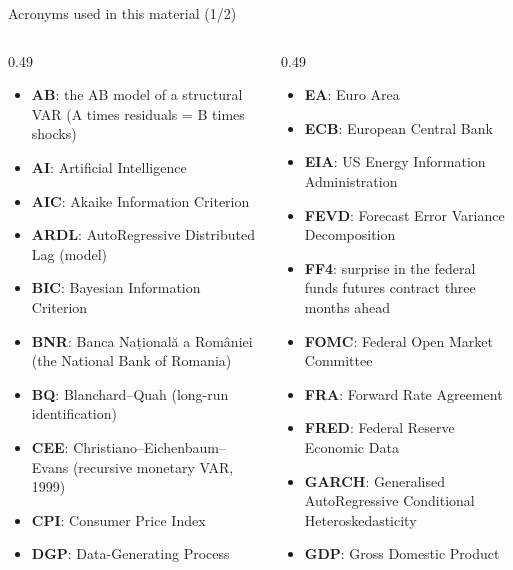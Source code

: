 \begin{frame}{Acronyms used in this material (1/2)}
\begin{columns}[T]
\begin{column}{0.49\textwidth}
\begin{itemize}\setlength{\itemsep}{0pt}
    \item \textbf{AB}: the AB model of a structural VAR (A times residuals = B times shocks)
    \item \textbf{AI}: Artificial Intelligence
    \item \textbf{AIC}: Akaike Information Criterion
    \item \textbf{ARDL}: AutoRegressive Distributed Lag (model)
    \item \textbf{BIC}: Bayesian Information Criterion
    \item \textbf{BNR}: Banca Națională a României (the National Bank of Romania)
    \item \textbf{BQ}: Blanchard–Quah (long-run identification)
    \item \textbf{CEE}: Christiano–Eichenbaum–Evans (recursive monetary VAR, 1999)
    \item \textbf{CPI}: Consumer Price Index
    \item \textbf{DGP}: Data-Generating Process
\end{itemize}
\end{column}
\begin{column}{0.49\textwidth}
\begin{itemize}\setlength{\itemsep}{0pt}
    \item \textbf{EA}: Euro Area
    \item \textbf{ECB}: European Central Bank
    \item \textbf{EIA}: US Energy Information Administration
    \item \textbf{FEVD}: Forecast Error Variance Decomposition
    \item \textbf{FF4}: surprise in the federal funds futures contract three months ahead
    \item \textbf{FOMC}: Federal Open Market Committee
    \item \textbf{FRA}: Forward Rate Agreement
    \item \textbf{FRED}: Federal Reserve Economic Data
    \item \textbf{GARCH}: Generalised AutoRegressive Conditional Heteroskedasticity
    \item \textbf{GDP}: Gross Domestic Product
\end{itemize}
\end{column}
\end{columns}
\end{frame}
